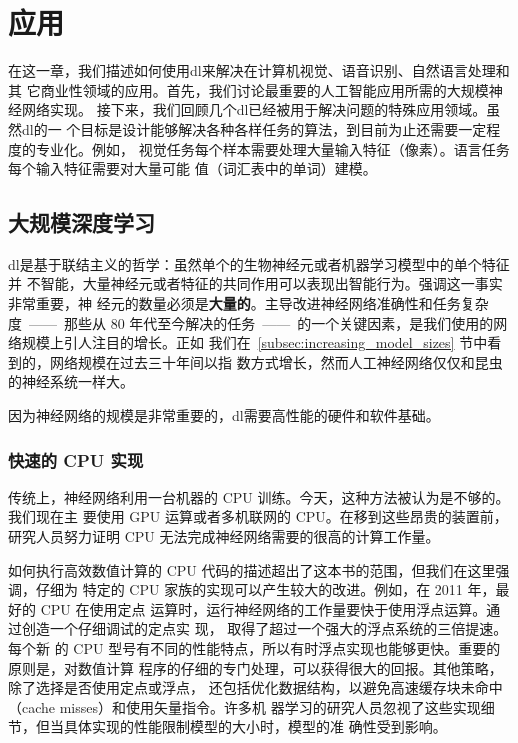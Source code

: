 \chapter{应用}
\label{ch:applications}

在这一章，我们描述如何使用\gls*{dl}来解决在计算机视觉、语音识别、自然语言处理和其
它商业性领域的应用。首先，我们讨论最重要的人工智能应用所需的大规模神经网络实现。
接下来，我们回顾几个\gls*{dl}已经被用于解决问题的特殊应用领域。虽然\gls*{dl}的一
个目标是设计能够解决各种各样任务的算法，到目前为止还需要一定程度的专业化。例如，
视觉任务每个样本需要处理大量输入特征（像素）。语言任务每个输入特征需要对大量可能
值（词汇表中的单词）建模。

\section{大规模深度学习}
\label{sec:large_scale_deep_learning}

\gls*{dl}是基于联结主义的哲学：虽然单个的生物神经元或者机器学习模型中的单个特征并
不智能，大量神经元或者特征的共同作用可以表现出智能行为。强调这一事实非常重要，神
经元的数量必须是\textbf{大量的}。主导改进神经网络准确性和任务复杂度~——~那些从 80
年代至今解决的任务~——~的一个关键因素，是我们使用的网络规模上引人注目的增长。正如
我们在~\ref{subsec:increasing_model_sizes} 节中看到的，网络规模在过去三十年间以指
数方式增长，然而人工神经网络仅仅和昆虫的神经系统一样大。

因为神经网络的规模是非常重要的，\gls*{dl}需要高性能的硬件和软件基础。

\subsection{快速的 CPU 实现}
\label{subsec:fast_cpu_implementations}

传统上，神经网络利用一台机器的 CPU 训练。今天，这种方法被认为是不够的。我们现在主
要使用 GPU 运算或者多机联网的 CPU。在移到这些昂贵的装置前，研究人员努力证明 CPU
无法完成神经网络需要的很高的计算工作量。

如何执行高效数值计算的 CPU 代码的描述超出了这本书的范围，但我们在这里强调，仔细为
特定的 CPU 家族的实现可以产生较大的改进。例如，在 2011 年，最好的 CPU 在使用定点
运算时，运行神经网络的工作量要快于使用浮点运算。通过创造一个仔细调试的定点实
现，\citet{improve-speed-on-cpus} 取得了超过一个强大的浮点系统的三倍提速。每个新
的 CPU 型号有不同的性能特点，所以有时浮点实现也能够更快。重要的原则是，对数值计算
程序的仔细的专门处理，可以获得很大的回报。其他策略，除了选择是否使用定点或浮点，
还包括优化数据结构，以避免高速缓存块未命中（cache misses）和使用矢量指令。许多机
器学习的研究人员忽视了这些实现细节，但当具体实现的性能限制模型的大小时，模型的准
确性受到影响。

